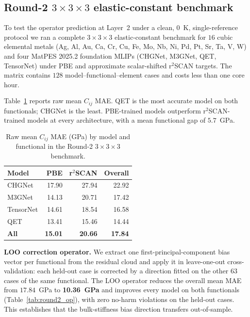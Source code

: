 \documentclass[11pt]{article}
\theoremstyle{remark}
\begin{document}
\subsection{Round-2 $3{\times}3{\times}3$ elastic-constant benchmark}
\label{sec:round2}

To test the operator prediction at Layer~2 under a clean, 0~K, single-reference
protocol we ran a complete $3{\times}3{\times}3$ elastic-constant benchmark for
$16$ cubic elemental metals (Ag, Al, Au, Ca, Cr, Cu, Fe, Mo, Nb, Ni, Pd, Pt, Sr,
Ta, V, W) and four MatPES 2025.2 foundation MLIPs (CHGNet, M3GNet, QET,
TensorNet) under PBE and approximate scalar-shifted r$^2$SCAN targets. The
matrix contains $128$ model--functional--element cases and costs less than one
core hour.

Table~\ref{tab:round2_raw} reports raw mean $C_{ij}$ MAE. QET is the most
accurate model on both functionals; CHGNet is the least. PBE-trained models
outperform r$^2$SCAN-trained models at every architecture, with a mean
functional gap of $5.7$~GPa.

\begin{table}[t]
\centering
\caption{Raw mean $C_{ij}$ MAE (GPa) by model and functional in the Round-2
$3{\times}3{\times}3$ benchmark.}
\label{tab:round2_raw}
\small
\begin{tabular}{lrrr}
\toprule
Model & PBE & r$^2$SCAN & Overall \\
\midrule
CHGNet & 17.90 & 27.94 & 22.92 \\
M3GNet & 14.13 & 20.71 & 17.42 \\
TensorNet & 14.61 & 18.54 & 16.58 \\
QET & 13.41 & 15.46 & 14.44 \\
\textbf{All} & \textbf{15.01} & \textbf{20.66} & \textbf{17.84} \\
\bottomrule
\end{tabular}
\end{table}

\textbf{LOO correction operator.} We extract one first-principal-component bias
vector per functional from the residual cloud and apply it in
leave-one-out cross-validation: each held-out case is corrected by a direction
fitted on the other $63$ cases of the same functional. The LOO operator reduces
the overall mean MAE from $17.84$~GPa to \textbf{10.36~GPa} and improves every
model on both functionals (Table~\ref{tab:round2_op}), with zero no-harm
violations on the held-out cases. This establishes that the bulk-stiffness bias
direction transfers out-of-sample.
\end{document}
